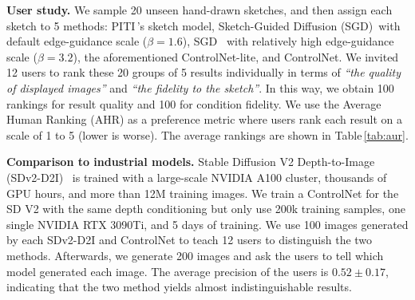\documentclass[10pt,twocolumn,letterpaper]{article}
\def\para#1{\vspace{0.25em}\noindent\textbf{#1}}
\begin{document}
	\para{User study.} We sample 20 unseen hand-drawn sketches, and then assign each sketch to 5 methods: 
	PITI\,\cite{wang2022pretraining}'s sketch model,
	Sketch-Guided Diffusion (SGD)\,\cite{voynov2022sketch} with default edge-guidance scale ($\beta=1.6$),
	SGD~\cite{voynov2022sketch} with relatively high edge-guidance scale ($\beta=3.2$),
	the aforementioned ControlNet-lite, and ControlNet. We invited 
	12 users to rank these 20 groups of 5 results individually in terms of \emph{``the quality of displayed images''} and \emph{``the fidelity to the sketch''}.
	In this way, we obtain 100 rankings for result quality and 100 for condition fidelity.
	We use the Average Human Ranking (AHR) as a preference metric where users rank each result on a scale of 1 to 5 (lower is worse).
	The average rankings are shown in Table\,\ref{tab:aur}.
	
	\para{Comparison to industrial models.} Stable Diffusion V2 Depth-to-Image (SDv2-D2I)~\cite{sdd} is trained with a large-scale NVIDIA A100 cluster, thousands of GPU hours, and more than 12M training images. We train a ControlNet for the SD V2 with the same depth conditioning but only use 200k training samples, one single NVIDIA RTX 3090Ti, and 5 days of training. We use 100 images generated by each SDv2-D2I and ControlNet to teach 12 users to distinguish the two methods. Afterwards, we generate 200 images and ask the users to tell which model generated each image. The average precision of the users is $0.52 \pm 0.17$, indicating that the two method yields almost indistinguishable results.
	
	\begin{table}[!t]
		\centering
		\vspace{-7pt}
		\caption{Evaluation for image generation conditioned by semantic segmentation. We report FID, CLIP text-image score, and CLIP aesthetic scores for our method and other baselines. We also report the performance of Stable Diffusion without segmentation conditions. Methods marked with ``*'' are trained from scratch.}
		\vspace{-9pt}
		\label{tab:fid}
	\end{table}
	
\end{document}
